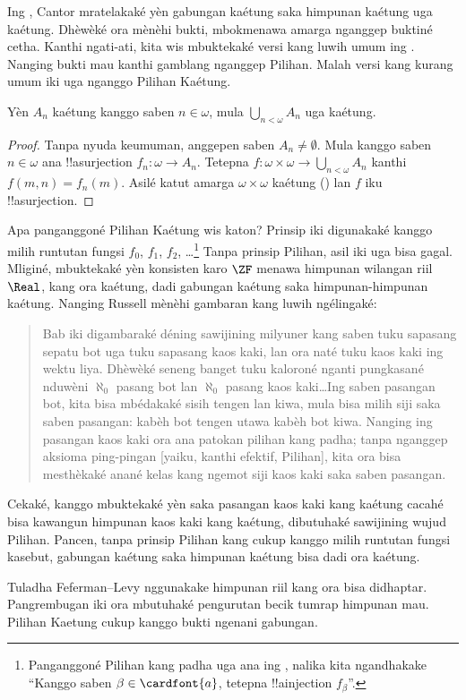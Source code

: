\documentclass[../../../include/open-logic-section]{subfiles}
\begin{document}
\begin{ex}
Ing \citeyear{Cantor1878}, Cantor mratelakaké yèn gabungan kaétung
saka himpunan kaétung uga kaétung. Dhèwèké ora mènèhi bukti,
mbokmenawa amarga nganggep buktiné cetha. Kanthi ngati-ati, kita wis
mbuktekaké versi kang luwih umum ing
. Nanging bukti mau
kanthi gamblang nganggep Pilihan. Malah versi kang kurang umum iki
uga nganggo Pilihan Kaétung.

\begin{thm}
Yèn $A_n$ kaétung kanggo saben $n \in \omega$, mula $\bigcup_{n <
\omega} A_n$ uga kaétung.
\end{thm}

\begin{proof}
Tanpa nyuda keumuman, anggepen saben $A_n \neq \emptyset$.
Mula kanggo saben $n \in \omega$ ana !!a{surjection}
$f_n \colon \omega \to A_n$. Tetepna
$f \colon \omega \times \omega \to \bigcup_{n < \omega} A_n$
kanthi $f(m, n) = f_n(m)$. Asilé katut amarga $\omega \times \omega$
kaétung () lan $f$
iku !!a{surjection}.
\end{proof}
\noindent
Apa panganggoné Pilihan Kaétung wis katon? Prinsip iki
digunakaké kanggo milih runtutan fungsi $f_0$, $f_1$, $f_2$,
\dots\footnote{Panganggoné Pilihan kang padha uga ana ing
, nalika kita
ngandhakake ``Kanggo saben $\beta \in \cardfont{a}$, tetepna
!!a{injection} $f_\beta$''.} Tanpa prinsip Pilihan, asil iki uga
bisa gagal. Mliginé, \citet{FefermanLevy1963} mbuktekaké yèn
konsisten karo $\ZF$ menawa himpunan wilangan riil $\Real$, kang
ora kaétung, dadi gabungan kaétung saka himpunan-himpunan kaétung.
Nanging Russell mènèhi gambaran kang luwih ngélingaké:
\begin{quote}
  Bab iki digambaraké déning sawijining milyuner kang saben tuku
  sapasang sepatu bot uga tuku sapasang kaos kaki, lan ora naté
  tuku kaos kaki ing wektu liya. Dhèwèké seneng banget tuku
  kaloroné nganti pungkasané nduwèni $\aleph_0$ pasang bot lan
  $\aleph_0$ pasang kaos kaki\dots\@ Ing saben pasangan bot, kita
  bisa mbédakaké sisih tengen lan kiwa, mula bisa milih siji saka
  saben pasangan: kabèh bot tengen utawa kabèh bot kiwa. Nanging
  ing pasangan kaos kaki ora ana patokan pilihan kang padha; tanpa
  nganggep aksioma ping-pingan [yaiku, kanthi efektif, Pilihan],
  kita ora bisa mesthèkaké anané kelas kang ngemot siji kaos kaki
  saka saben pasangan.
  \citep[kaca~126]{Russell1919}
\end{quote}
Cekaké, kanggo mbuktekaké yèn saka pasangan kaos kaki kang kaétung
cacahé bisa kawangun himpunan kaos kaki kang kaétung, dibutuhaké
sawijining wujud Pilihan. Pancen, tanpa prinsip Pilihan kang cukup kanggo milih runtutan
fungsi kasebut, gabungan kaétung saka himpunan kaétung
bisa dadi ora kaétung.
\end{ex}
Tuladha Feferman--Levy nggunakake himpunan riil kang ora bisa didhaptar. Pangrembugan iki ora mbutuhaké pengurutan becik tumrap himpunan mau. Pilihan Kaetung cukup kanggo bukti ngenani gabungan.
\end{document}
